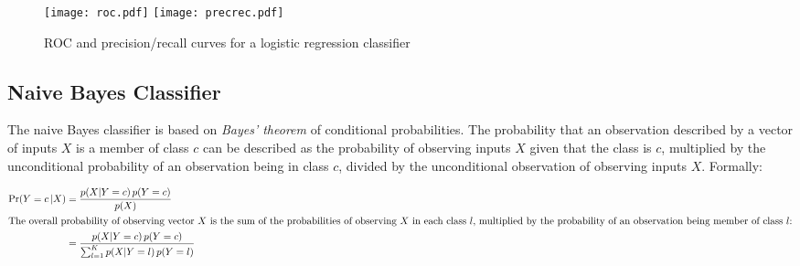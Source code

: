 \begin{samepage}
\end{samepage}

\begin{figure}
\centering 
\texttt{[image: roc.pdf]}
\texttt{[image: precrec.pdf]}
\caption{ROC and precision/recall curves for a logistic regression classifier}
\label{fig:logregplot}
\end{figure}

\subsection{Naive Bayes Classifier}

The naive Bayes classifier is based on \emph{Bayes' theorem} of conditional probabilities. The probability that an observation described by a vector of inputs $X$ is a member of class $c$ can be described as the probability of observing inputs $X$ given that the class is $c$, multiplied by the unconditional probability of an observation being in class $c$, divided by the unconditional observation of observing inputs $X$. Formally:

\begin{align}
\Pr(Y=c\, | X) &= \frac{p(X|Y=c)\, p(Y=c)}{p(X)} \nonumber \\
\intertext{The overall probability of observing vector $X$ is the sum of the probabilities of observing $X$ in each class $l$, multiplied by the probability of an observation being member of class $l$:}
&= \frac{p(X|Y=c)\,p(Y=c) }{\sum_{l=1}^K p(X|Y=l)\,p(Y=l)}  \label{eq:bayes1}
\end{align}

